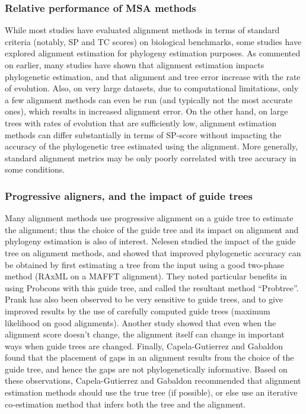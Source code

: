 \subsubsection{Relative performance of MSA methods}
While most studies have evaluated alignment methods in terms of standard criteria 
(notably, SP and TC scores) on biological
benchmarks, some studies have explored alignment estimation for phylogeny estimation
purposes. As commented on earlier, many studies have shown that alignment estimation
impacts phylogenetic estimation, and that alignment and tree error increase with the rate
of evolution. Also, on very large datasets, due to computational limitations, only a few
alignment methods can even be run (and typically not the most accurate ones), which
results in increased alignment error. On the other hand, on large trees with rates of
evolution that are sufficiently low, alignment estimation methods can differ substantially
in terms of SP-score without impacting the accuracy of the phylogenetic tree estimated
using the alignment. More generally, standard alignment metrics may be only poorly
correlated with tree accuracy in some conditions.

\subsubsection{Progressive aligners, and the impact of guide trees}
Many alignment methods
use progressive alignment on a guide tree to estimate the alignment; thus the choice of the
guide tree and its impact on alignment and phylogeny estimation is also of interest. 
Nelesen studied the impact of the guide tree on alignment methods,
and showed that improved phylogenetic accuracy can be obtained by first estimating a tree
from the input using a good two-phase method (RAxML on a MAFFT alignment).
They noted particular benefits in using Probcons with this guide tree, and called the
resultant method ``Probtree''. Prank has also been observed to be very sensitive to guide
trees, and to give improved results by the use of carefully computed guide trees
(maximum likelihood on good alignments). Another study showed that even
when the alignment score doesn't change, the alignment itself can change in important
ways when guide trees are changed. Finally, Capela-Gutierrez and Gabaldon
found that the placement of gaps in an alignment results from the choice of the guide tree,
and hence the gaps are not phylogenetically informative. Based on these observations,
Capela-Gutierrez and Gabaldon recommended that alignment estimation methods should
use the true tree (if possible), or else use an iterative co-estimation method that infers
both the tree and the alignment.

